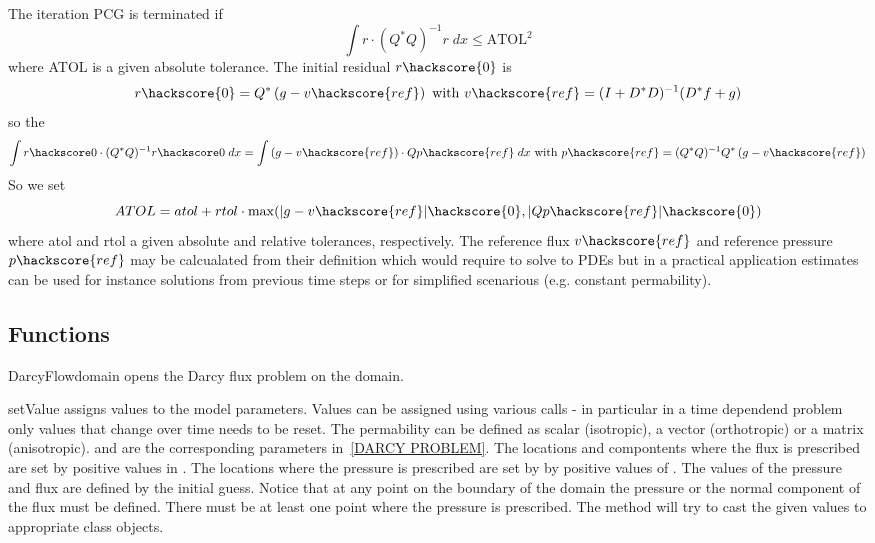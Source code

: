The iteration PCG  is terminated if
\begin{equation}\label{DARCY STOP}
\int r \cdot (Q^*Q)^{-1} r \; dx \le \mbox{ATOL}^2
\end{equation}
where ATOL is a given absolute tolerance.
The initial residual $r\hackscore{0}$ is 
\begin{equation}\label{DARCY STOP 2}
r\hackscore{0}=Q^* \left( g - v\hackscore{ref} \right) \mbox{ with } v\hackscore{ref} = (I+D^*D)^{-1} (D^*f + g)
\end{equation}
so the 
\begin{equation}\label{DARCY NORM 0}
\int r\hackscore0 \cdot (Q^*Q)^{-1} r\hackscore0 \; dx = \int \left( g - v\hackscore{ref} \right)  \cdot  Q  p\hackscore{ref} \; dx \mbox{ with }p\hackscore{ref} = (Q^*Q)^{-1} Q^* \left( g - v\hackscore{ref} \right)
\end{equation}
So we set 
\begin{equation}\label{DARCY NORM 1}
ATOL = atol + rtol \cdot \max(|g - v\hackscore{ref}|\hackscore{0}, |Q p\hackscore{ref} |\hackscore{0} )
\end{equation}
where atol and rtol a given absolute and relative tolerances, respectively. The reference flux $v\hackscore{ref}$
and reference pressure $p\hackscore{ref}$ may be calcualated from their definition which would require to solve to
PDEs but in a practical application estimates can be used for instance solutions from previous time steps or for simplified scenarious (e.g. constant permability). 

\subsection{Functions}
\begin{classdesc}{DarcyFlow}{domain}
opens the Darcy flux problem on the \Domain domain.
\end{classdesc}
\begin{methoddesc}[DarcyFlow]{setValue}{}
assigns values to the model parameters. Values can be assigned using various calls - in particular 
in a time dependend problem only values that change over time needs to be reset. The permability can be defined as scalar (isotropic), a vector (orthotropic) or a matrix (anisotropic). 
 and  are the corresponding parameters in~\ref{DARCY PROBLEM}.
The locations and compontents where the flux is prescribed are set by positive values in
. 
The locations where the pressure is prescribed are set by 
by positive values of . 
The values of the pressure and flux are defined by the initial guess.
Notice that at any point on the boundary of the domain the pressure or the normal component of
the flux must be defined. There must be at least one point where the pressure is prescribed. 
The method will try to cast the given values to appropriate 
\Data class objects.
\end{methoddesc}

